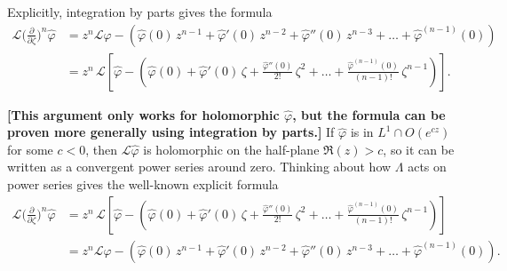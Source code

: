 \documentclass{article}
\theoremstyle{definition}
\theoremstyle{plain}
\newcommand{\laplace}{\mathcal{L}}
\begin{document}
Explicitly, integration by parts gives the formula
\begin{align*}
\laplace \big(\tfrac{\partial}{\partial \zeta}\big)^n \hat{\varphi} & = z^n \laplace \hat{\varphi} - \left( \hat{\varphi}(0)\,z^{n-1} + \hat{\varphi}'(0)\,z^{n-2} + \hat{\varphi}''(0)\,z^{n-3} + \ldots + \hat{\varphi}^{(n-1)}(0) \right) \\
& = z^n\,\laplace\left[ \hat{\varphi} - \left( \hat{\varphi}(0) + \hat{\varphi}'(0)\,\zeta + \tfrac{\hat{\varphi}''(0)}{2!}\,\zeta^2 + \ldots + \tfrac{\hat{\varphi}^{(n-1)}(0)}{(n-1)!}\,\zeta^{n-1} \right) \right].
\end{align*}

\textbf{[This argument only works for holomorphic $\hat{\varphi}$, but the formula can be proven more generally using integration by parts.]} If $\hat{\varphi}$ is in $L^1 \cap O(e^{cz})$ for some $c < 0$, then $\laplace \hat{\varphi}$ is holomorphic on the half-plane $\Re(z) > c$, so it can be written as a convergent power series around zero. Thinking about how $\Lambda$ acts on power series gives the well-known explicit formula
\begin{align*}
\laplace \big(\tfrac{\partial}{\partial \zeta}\big)^n \hat{\varphi} & = z^n\,\laplace\left[ \hat{\varphi} - \left( \hat{\varphi}(0) + \hat{\varphi}'(0)\,\zeta + \tfrac{\hat{\varphi}''(0)}{2!}\,\zeta^2 + \ldots + \tfrac{\hat{\varphi}^{(n-1)}(0)}{(n-1)!}\,\zeta^{n-1} \right) \right] \\
& = z^n \laplace \hat{\varphi} - \left( \hat{\varphi}(0)\,z^{n-1} + \hat{\varphi}'(0)\,z^{n-2} + \hat{\varphi}''(0)\,z^{n-3} + \ldots + \hat{\varphi}^{(n-1)}(0) \right).
\end{align*}
\end{document}
